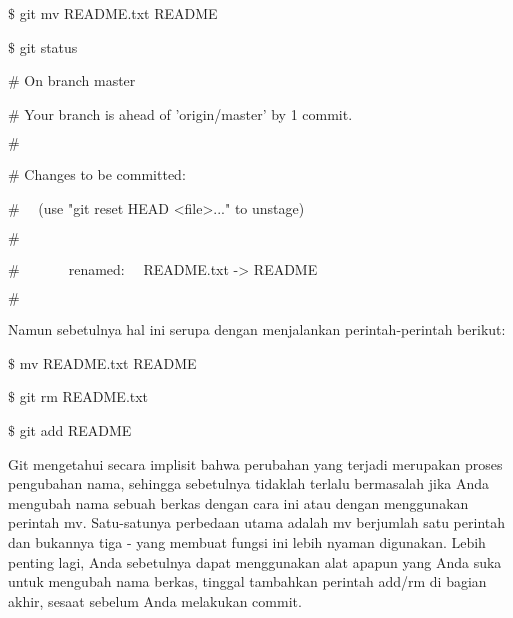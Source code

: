 \noindent 
{\fontsize{14pt}{14pt}\selectfont  $  \$  $ git mv README.txt README \\} \par
\noindent 
{\fontsize{14pt}{14pt}\selectfont  $  \$  $ git status \\} \par
\noindent 
{\fontsize{14pt}{14pt}\selectfont  $  \#  $ On branch master \\} \par
\noindent 
{\fontsize{14pt}{14pt}\selectfont  $  \#  $ Your branch is ahead of 'origin/master' by 1 commit. \\} \par
\noindent 
{\fontsize{14pt}{14pt}\selectfont  $  \#  $ \\} \par
\noindent 
{\fontsize{14pt}{14pt}\selectfont  $  \#  $ Changes to be committed: \\} \par
\noindent 
{\fontsize{14pt}{14pt}\selectfont  $  \#  $~~ (use "git reset HEAD <file>..." to unstage) \\} \par
\noindent 
{\fontsize{14pt}{14pt}\selectfont  $  \#  $ \\} \par
\noindent 
{\fontsize{14pt}{14pt}\selectfont  $  \#  $~~~~~~~renamed:~~  README.txt -> README \\} \par
\noindent 
{\fontsize{14pt}{14pt}\selectfont  $  \#  $ \\} \par
\noindent 
{\fontsize{14pt}{14pt}\selectfont Namun sebetulnya hal ini serupa dengan menjalankan perintah-perintah berikut: \\} \par
\noindent 
{\fontsize{14pt}{14pt}\selectfont  $  \$  $ mv README.txt README \\} \par
\noindent 
{\fontsize{14pt}{14pt}\selectfont  $  \$  $ git rm README.txt \\} \par
\noindent 
{\fontsize{14pt}{14pt}\selectfont  $  \$  $ git add README \\} \par
\noindent 
{\fontsize{14pt}{14pt}\selectfont Git mengetahui secara implisit bahwa perubahan yang terjadi merupakan proses pengubahan nama, sehingga sebetulnya tidaklah terlalu bermasalah jika Anda mengubah nama sebuah berkas dengan cara ini atau dengan menggunakan perintah $  $mv. Satu-satunya perbedaan utama adalah $  $mv $  $berjumlah satu perintah dan bukannya tiga - yang membuat fungsi ini lebih nyaman digunakan. Lebih penting lagi, Anda sebetulnya dapat menggunakan alat apapun yang Anda suka untuk mengubah nama berkas, tinggal tambahkan perintah add/rm di bagian akhir, sesaat sebelum Anda melakukan commit. \\} \par
\vspace{14pt}
\vspace{14pt}
\vspace{14pt}
\vspace{14pt}
\vspace{14pt}
